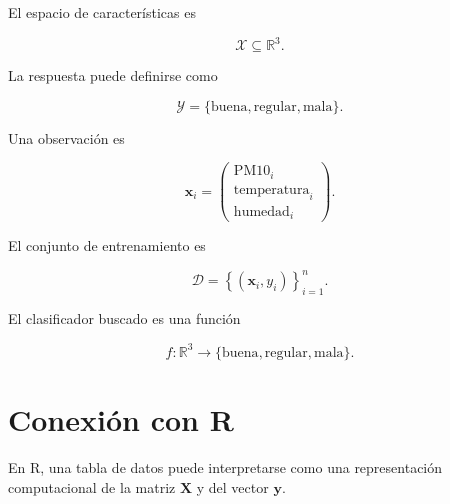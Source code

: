 \documentclass[
  spanish,
  10.5pt,
  letterpaper,
  DIV=11,
  numbers=noendperiod,
  oneside,
  open=any]{scrreprt}
\newenvironment{Shaded}{\begin{snugshade}}{\end{snugshade}}
\newcommand{\AttributeTok}[1]{\textcolor[rgb]{0.40,0.45,0.13}{#1}}
\newcommand{\DecValTok}[1]{\textcolor[rgb]{0.68,0.00,0.00}{#1}}
\newcommand{\FunctionTok}[1]{\textcolor[rgb]{0.28,0.35,0.67}{#1}}
\newcommand{\NormalTok}[1]{\textcolor[rgb]{0.00,0.23,0.31}{#1}}
\newcommand{\OtherTok}[1]{\textcolor[rgb]{0.00,0.23,0.31}{#1}}
\newcommand{\SpecialCharTok}[1]{\textcolor[rgb]{0.37,0.37,0.37}{#1}}
\newcommand{\StringTok}[1]{\textcolor[rgb]{0.13,0.47,0.30}{#1}}
\theoremstyle{definition}
\theoremstyle{definition}
\theoremstyle{plain}
\theoremstyle{remark}
\begin{document}
El espacio de características es

\[
\mathcal{X}\subseteq\mathbb{R}^{3}.
\]

La respuesta puede definirse como

\[
\mathcal{Y}
=
\{\text{buena},\text{regular},\text{mala}\}.
\]

Una observación es

\[
\mathbf{x}_i
=
\begin{pmatrix}
\text{PM10}_i\\
\text{temperatura}_i\\
\text{humedad}_i
\end{pmatrix}.
\]

El conjunto de entrenamiento es

\[
\mathcal{D}
=
\left\{
(\mathbf{x}_i,y_i)
\right\}_{i=1}^{n}.
\]

El clasificador buscado es una función

\[
\widehat{f}:\mathbb{R}^{3}
\to
\{\text{buena},\text{regular},\text{mala}\}.
\]

\section*{Conexión con R}\label{conexiuxf3n-con-r}


En R, una tabla de datos puede interpretarse como una representación
computacional de la matriz \(\mathbf{X}\) y del vector \(\mathbf{y}\).

\begin{Shaded}
\end{Shaded}
\end{document}
